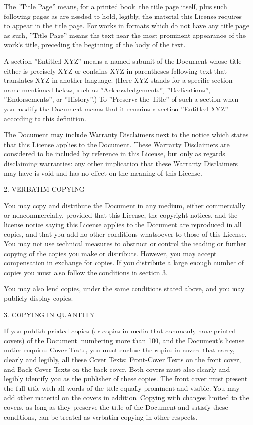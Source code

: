 The ''Title Page'' means, for a printed book, the title page itself, plus such following pages as are needed to hold,
legibly, the material this License requires to appear in the title page. For works in formats which do not have any
title page as such, ''Title Page'' means the text near the most prominent appearance of the work's title, preceding the
beginning of the body of the text.

A section ''Entitled XYZ'' means a named subunit of the Document whose title either is precisely XYZ or contains XYZ in
parentheses following text that translates XYZ in another language. (Here XYZ stands for a specific section name
mentioned below, such as ''Acknowledgements'', ''Dedications'', ''Endorsements'', or ''History''.) To ''Preserve the
Title'' of such a section when you modify the Document means that it remains a section ''Entitled XYZ'' according to
this definition.

The Document may include Warranty Disclaimers next to the notice which states that this License applies to the
Document. These Warranty Disclaimers are considered to be included by reference in this License, but only as regards
disclaiming warranties: any other implication that these Warranty Disclaimers may have is void and has no effect on the
meaning of this License.

2. VERBATIM COPYING

You may copy and distribute the Document in any medium, either commercially or noncommercially, provided that this
License, the copyright notices, and the license notice saying this License applies to the Document are reproduced in
all copies, and that you add no other conditions whatsoever to those of this License. You may not use technical
measures to obstruct or control the reading or further copying of the copies you make or distribute. However, you may
accept compensation in exchange for copies. If you distribute a large enough number of copies you must also follow the
conditions in section 3.

You may also lend copies, under the same conditions stated above, and you may publicly display copies.

3. COPYING IN QUANTITY

If you publish printed copies (or copies in media that commonly have printed covers) of the Document, numbering more
than 100, and the Document's license notice requires Cover Texts, you must enclose the copies in covers that carry,
clearly and legibly, all these Cover Texts: Front-Cover Texts on the front cover, and Back-Cover Texts on the back
cover. Both covers must also clearly and legibly identify you as the publisher of these copies. The front cover must
present the full title with all words of the title equally prominent and visible. You may add other material on the
covers in addition. Copying with changes limited to the covers, as long as they preserve the title of the Document and
satisfy these conditions, can be treated as verbatim copying in other respects.

